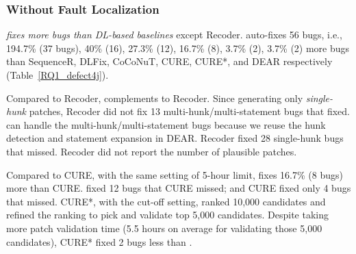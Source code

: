 \subsubsection{{\bf Without Fault Localization}}

{\em {\tool} fixes more bugs than DL-based baselines} except
Recoder. {\tool} auto-fixes 56 bugs, i.e., 194.7\% (37 bugs), 40\%
(16), 27.3\% (12), 16.7\% (8), 3.7\% (2), 3.7\% (2) more bugs than
SequenceR, DLFix, CoCoNuT, CURE, CURE*, and DEAR respectively
(Table~\ref{RQ1_defect4j}).

Compared to Recoder, {\tool} complements to Recoder. Since generating
only {\em single-hunk} patches, Recoder did not fix 13
multi-hunk/multi-statement bugs that {\tool} fixed.  {\tool} can
handle the multi-hunk/multi-statement bugs because we reuse the hunk
detection and statement expansion in DEAR.
%
Recoder fixed 28 single-hunk bugs that {\tool} missed. Recoder did not
report the number of plausible patches.


Compared to CURE, with the same setting of 5-hour limit, {\tool} fixes
16.7\% (8 bugs) more than CURE. {\tool} fixed 12 bugs that
CURE missed; and CURE fixed only 4 bugs that {\tool} missed.
%
CURE*, with the cut-off setting, ranked 10,000 candidates and refined
the ranking to pick and validate top 5,000 candidates. Despite taking
more patch validation time (5.5 hours on average for
validating those 5,000 candidates), CURE* fixed 2 bugs less than
{\tool}.



